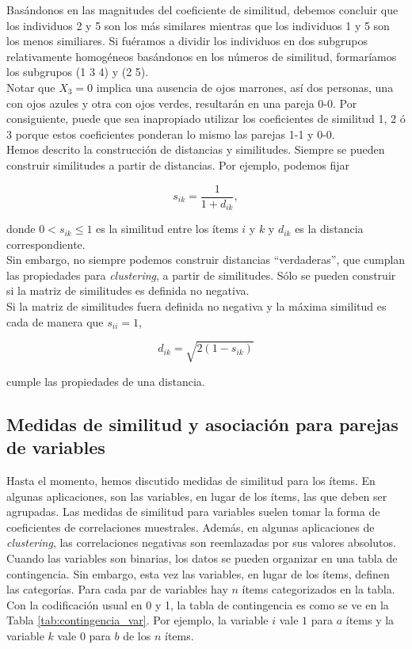 \documentclass[a4paper, 20pt]{article}
\begin{document}
Basándonos en las magnitudes del coeficiente de similitud, debemos concluir que los individuos 2 y 5 son los más similares mientras que los individuos 1 y 5 son los menos similiares. Si fuéramos a dividir los individuos en dos subgrupos relativamente homogéneos basándonos en los números de similitud, formaríamos los subgrupos (1 3 4) y (2 5).\\
Notar que $X_3=0$ implica una ausencia de ojos marrones, así dos personas, una con ojos azules y otra con ojos verdes, resultarán en una pareja 0-0. Por consiguiente, puede que sea inapropiado utilizar los coeficientes de similitud 1, 2 ó 3 porque estos coeficientes ponderan lo mismo las parejas 1-1 y 0-0.\\

Hemos descrito la construcción de distancias y similitudes. Siempre se pueden construir similitudes a partir de distancias. Por ejemplo, podemos fijar

$$ s_{ik} = \frac{1}{1+d_{ik}},$$ 

donde $0<s_{ik}\leq 1$ es la similitud entre los ítems $i$ y $k$ y $d_{ik}$ es la distancia correspondiente.\\
Sin embargo, no siempre podemos construir distancias ``verdaderas'', que cumplan las propiedades para \textit{clustering}, a partir de similitudes. Sólo se pueden construir si la matriz de similitudes es definida no negativa.\\
Si la matriz de similitudes fuera definida no negativa y la máxima similitud es cada de manera que $s_{ii}=1$,

$$ d_{ik}=\sqrt{2(1-s_{ik})}$$

cumple las propiedades de una distancia.

\subsection{Medidas de similitud y asociación para parejas de variables}

Hasta el momento, hemos discutido medidas de similitud para los ítems. En algunas aplicaciones, son las variables, en lugar de los ítems, las que deben ser agrupadas. Las medidas de similitud para variables suelen tomar la forma de coeficientes de correlaciones muestrales. Además, en algunas aplicaciones de \textit{clustering}, las correlaciones negativas son reemlazadas por sus valores absolutos.\\
Cuando las variables son binarias, los datos se pueden organizar en una tabla de contingencia. Sin embargo, esta vez las variables, en lugar de los ítems, definen las categorías. Para cada par de variables hay $n$ ítems categorizados en la tabla. Con la codificación usual en 0 y 1, la tabla de contingencia es como se ve en la Tabla \ref{tab:contingencia_var}. Por ejemplo, la variable $i$ vale $1$ para $a$ ítems y la variable $k$ vale $0$ para $b$ de los $n$ ítems.\\
\end{document}
